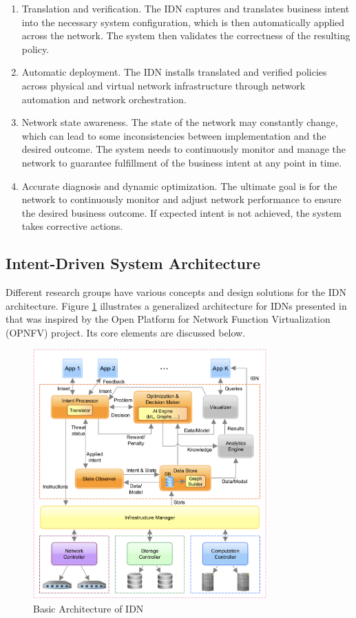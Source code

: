 \begin{enumerate}
	\item Translation and verification. The IDN captures and translates business intent into the necessary system configuration, which is then automatically applied across the network. The system then validates the correctness of the resulting policy.
	\item Automatic deployment. The IDN installs translated and verified policies across physical and virtual network infrastructure through network automation and network orchestration.
	\item Network state awareness. The state of the network may constantly change, which can lead to some inconsistencies between implementation and the desired outcome. The system needs to continuously monitor and manage the network to guarantee fulfillment of the business intent at any point in time.
	\item Accurate diagnosis and dynamic optimization. The ultimate goal is for the network to continuously monitor and adjust network performance to ensure the desired business outcome. If expected intent is not achieved, the system takes corrective actions.
\end{enumerate}


\subsection{Intent-Driven System Architecture}

Different research groups have various concepts and design solutions for the IDN architecture. Figure \ref{fig:IDN_Architecture} illustrates a generalized architecture for IDNs presented in \cite[3]{Saha2018} that was inspired by the Open Platform for Network Function Virtualization (OPNFV) project. Its core elements are discussed below.  

\begin{figure}[htb]
  \centering
  \includegraphics[width=0.8\textwidth]{figures/IBN_Architecture.png}
  \caption{Basic Architecture of IDN\cite{Saha2018}}
  \label{fig:IDN_Architecture}
\end{figure}

